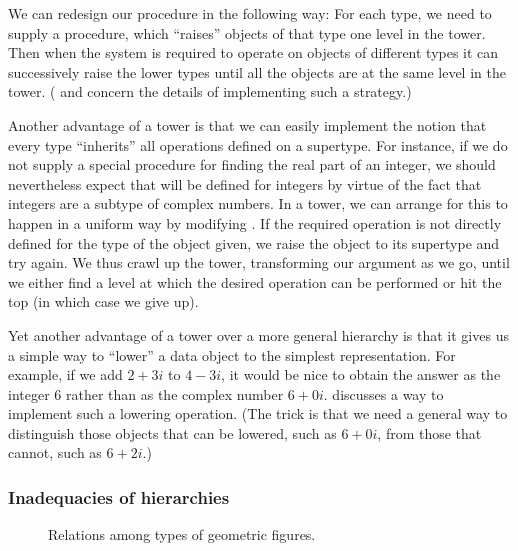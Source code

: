 We can redesign our  procedure in the following way:
For each type, we need to supply a  procedure, which “raises” objects of that type one level in the tower.
Then when the system is required to operate on objects of different types it can successively raise the lower types until all the objects are at the same level in the tower.
( and  concern the details of implementing such a strategy.)

Another advantage of a tower is that we can easily implement the notion that every type “inherits” all operations defined on a supertype.
For instance, if we do not supply a special procedure for finding the real part of an integer, we should nevertheless expect that  will be defined for integers by virtue of the fact that integers are a subtype of complex numbers.
In a tower, we can arrange for this to happen in a uniform way by modifying .
If the required operation is not directly defined for the type of the object given, we raise the object to its supertype and try again.
We thus crawl up the tower, transforming our argument as we go, until we either find a level at which the desired operation can be performed or hit the top (in which case we give up).

Yet another advantage of a tower over a more general hierarchy is that it gives us a simple way to “lower” a data object to the simplest representation.
For example, if we add \( 2 + 3i \) to \( 4 - 3i \), it would be nice to obtain the answer as the integer 6 rather than as the complex number \( 6 + 0i \).
 discusses a way to implement such a lowering operation.
(The trick is that we need a general way to distinguish those objects that can be lowered, such as \( 6 + 0i \), from those that cannot, such as \( 6 + 2i \).)



\subsubsection*{Inadequacies of hierarchies}

\begin{figure}[tb]
	\centering
	
	\caption{Relations among types of geometric figures.}
	\label{Figure 2.26}
\end{figure}


